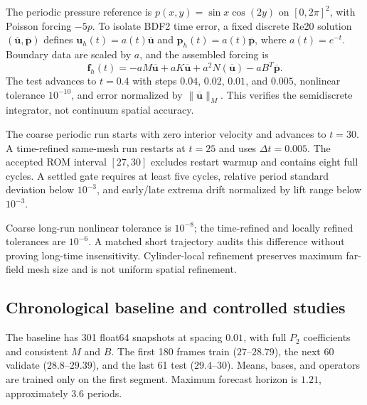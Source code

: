 \documentclass[11pt,a4paper]{article}
\begin{document}
The periodic pressure reference is $p(x,y)=\sin x\cos(2y)$ on $[0,2\pi]^2$, with Poisson forcing $-5p$. To isolate BDF2 time error, a fixed discrete Re20 solution $(\overline{\bm u},\overline{\bm p})$ defines $\bm u_h(t)=a(t)\overline{\bm u}$ and $\bm p_h(t)=a(t)\overline{\bm p}$, where $a(t)=e^{-t}$. Boundary data are scaled by $a$, and the assembled forcing is
\begin{equation}
 \bm f_h(t)=-aM\overline{\bm u}+aK\overline{\bm u}
 +a^2N(\overline{\bm u})-aB^T\overline{\bm p}.\label{eq:manufactured}
\end{equation}
The test advances to $t=0.4$ with steps $0.04$, $0.02$, $0.01$, and $0.005$, nonlinear tolerance $10^{-10}$, and error normalized by $\|\overline{\bm u}\|_M$. This verifies the semidiscrete integrator, not continuum spatial accuracy.

The coarse periodic run starts with zero interior velocity and advances to $t=30$. A time-refined same-mesh run restarts at $t=25$ and uses $\Delta t=0.005$. The accepted ROM interval $[27,30]$ excludes restart warmup and contains eight full cycles. A settled gate requires at least five cycles, relative period standard deviation below $10^{-3}$, and early/late extrema drift normalized by lift range below $10^{-3}$.

Coarse long-run nonlinear tolerance is $10^{-8}$; the time-refined and locally refined tolerances are $10^{-6}$. A matched short trajectory audits this difference without proving long-time insensitivity. Cylinder-local refinement preserves maximum far-field mesh size and is not uniform spatial refinement.

\subsection{Chronological baseline and controlled studies}
The baseline has 301 float64 snapshots at spacing $0.01$, with full $P_2$ coefficients and consistent $M$ and $B$. The first 180 frames train ($27$--$28.79$), the next 60 validate ($28.8$--$29.39$), and the last 61 test ($29.4$--$30$). Means, bases, and operators are trained only on the first segment. Maximum forecast horizon is $1.21$, approximately 3.6 periods.
\end{document}
